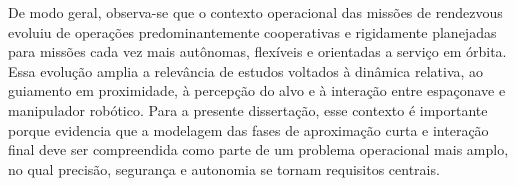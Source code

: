 De modo geral, observa-se que o contexto operacional das missões de rendezvous evoluiu de operações predominantemente cooperativas e rigidamente planejadas para missões cada vez mais autônomas, flexíveis e orientadas a serviço em órbita. Essa evolução amplia a relevância de estudos voltados à dinâmica relativa, ao guiamento em proximidade, à percepção do alvo e à interação entre espaçonave e manipulador robótico. Para a presente dissertação, esse contexto é importante porque evidencia que a modelagem das fases de aproximação curta e interação final deve ser compreendida como parte de um problema operacional mais amplo, no qual precisão, segurança e autonomia se tornam requisitos centrais.